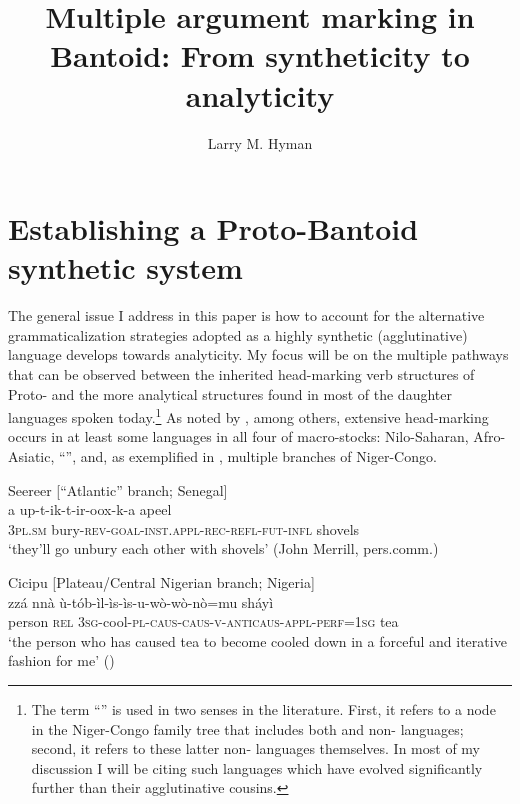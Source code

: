 \documentclass[output=paper]{langsci/langscibook}
\title{Multiple argument marking in Bantoid: From syntheticity to analyticity}
\author{%
 Larry M. Hyman\affiliation{University of California, Berkeley}  
}
\begin{document}



\section{Establishing a Proto-Bantoid synthetic system}\label{sec:hyman:1}

The general issue I address in this paper is how to account for the alternative grammaticalization strategies adopted as a highly synthetic (agglutinative) language develops towards analyticity. My focus will be on the multiple pathways that can be observed between the inherited head-marking verb structures of Proto- and the more analytical structures found in most of the daughter languages spoken today.\footnote{ The term “” is used in two senses in the literature. First, it refers to a node in the Niger-Congo family tree that includes both  and non- languages; second, it refers to these latter non- languages themselves. In most of my discussion I will be citing such  languages which have evolved significantly further than their agglutinative  cousins.} As noted by \citet[187--188]{Dimmendaal2000}, among others, extensive head-marking occurs in at least some languages in all four of  macro-stocks: Nilo-Saharan, Afro-Asiatic, “”, and, as exemplified in , multiple branches of Niger-Congo.

\ea%
    \label{ex:hyman:1}
  \ea \label{ex:hyman:1a}   Seereer [“Atlantic” branch; Senegal]\\
   \gll a up-t-ik-t-ir-oox-k-a  apeel \\
    \textsc{3pl}.\textsc{sm} bury-\textsc{rev}-\textsc{goal}-\textsc{inst.appl-rec-refl-fut}-\textsc{infl}  shovels\\
    \glt ‘they’ll go unbury each other with shovels’ (John Merrill, pers.comm.) 

    \ex \label{ex:hyman:1b} Cicipu [Plateau/Central Nigerian branch; Nigeria]\\
    \gll zzá  nnà  ù-tób-ìl-ìs-ìs-u-wò-wò-nò=mu  sháyì~~~\\
    person    \textsc{rel} \textsc{3sg}-cool-\textsc{pl-caus-caus-v-anticaus-appl-perf=1sg}    tea\\
      \glt  ‘the person who has caused tea to become cooled down in a forceful and iterative fashion for me’ (\citealt[209]{McGill2009})
  
\end{document}
